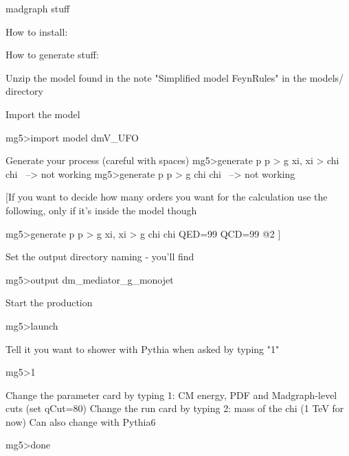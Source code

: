 madgraph stuff

How to install:



How to generate stuff:

Unzip the model found in the note "Simplified model FeynRules" in the models/ directory 

Import the model

mg5>import model dmV_UFO

Generate your process (careful with spaces)
mg5>generate p p > g xi, xi > chi chi~  --> not working
mg5>generate p p > g chi chi~  --> not working

[If you want to decide how many orders you want for the calculation use the following, only if it's inside the model though

mg5>generate p p > g xi, xi > g chi chi QED=99 QCD=99 @2 ]

Set the output directory naming - you'll find

mg5>output dm_mediator_g_monojet

Start the production

mg5>launch

Tell it you want to shower with Pythia when asked by typing "1"

mg5>1

Change the parameter card by typing 1: CM energy, PDF and Madgraph-level cuts (set qCut=80)
Change the run card by typing 2: mass of the chi (1 TeV for now)
Can also change with Pythia6

mg5>done